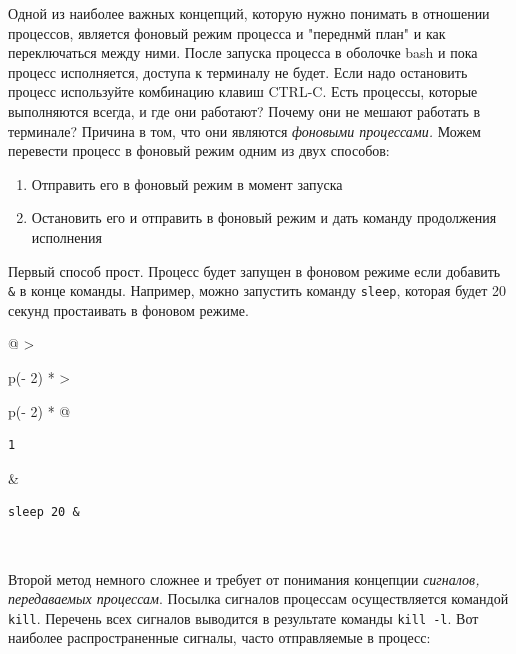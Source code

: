 \documentclass{article}
\begin{document}
Одной из наиболее важных концепций, которую нужно понимать в отношении
процессов, является фоновый режим процесса и "переднмй план" и как
переключаться между ними. После запуска процесса в оболочке bash и пока
процесс исполняется, доступа к терминалу не будет. Если надо остановить
процесс используйте комбинацию клавиш CTRL-C. Есть процессы, которые
выполняются всегда, и где они работают? Почему они не мешают работать в
терминале? Причина в том, что они являются \emph{фоновыми процессами.}
Можем перевести процесс в фоновый режим одним из двух способов:

\begin{enumerate}
\tightlist
\item
  Отправить его в фоновый режим в момент запуска
\item
  Остановить его и отправить в фоновый режим и дать команду продолжения
  исполнения
\end{enumerate}

Первый способ прост. Процесс будет запущен в фоновом режиме если
добавить \texttt{\&} в конце команды. Например, можно запустить команду
\texttt{sleep}, которая будет 20 секунд простаивать в фоновом режиме.

\begin{longtable}[]{@{}
  >{\raggedright\arraybackslash}p{(\columnwidth - 2\tabcolsep) * }
  >{\raggedright\arraybackslash}p{(\columnwidth - 2\tabcolsep) * }@{}}
\toprule
\endhead
\begin{minipage}[t]{\linewidth}\raggedright
\begin{verbatim}
1
\end{verbatim}
\end{minipage} & \begin{minipage}[t]{\linewidth}\raggedright
\begin{verbatim}
sleep 20 &
\end{verbatim}
\end{minipage} \\ \addlinespace
\bottomrule
\end{longtable}

Второй метод немного сложнее и требует от понимания концепции
\emph{сигналов, передаваемых процессам}. Посылка сигналов процессам
осуществляется командой \texttt{kill}. Перечень всех сигналов выводится
в результате команды \texttt{kill\ -l}. Вот наиболее распространенные
сигналы, часто отправляемые в процесс:
\end{document}
